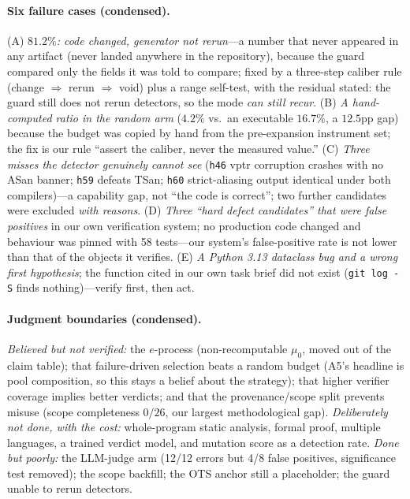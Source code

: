 \paragraph{Six failure cases (condensed).}
(A) \emph{$81.2\%$: code changed, generator not rerun}---a number that never appeared in any
artifact (never landed anywhere in the repository), because the guard compared only the fields it
was told to compare; fixed by a three-step caliber rule (change $\Rightarrow$ rerun
$\Rightarrow$ void) plus a range self-test, with the residual stated: the guard still does not rerun
detectors, so the mode \emph{can still recur}.
(B) \emph{A hand-computed ratio in the random arm} ($4.2\%$ vs.\ an executable $16.7\%$, a
$12.5$pp gap) because the budget was copied by hand from the pre-expansion instrument set; the fix
is our rule ``assert the caliber, never the measured value.'' (C) \emph{Three misses the detector
genuinely cannot see} (\texttt{h46} vptr corruption crashes with no ASan banner; \texttt{h59}
defeats TSan; \texttt{h60} strict-aliasing output identical under both compilers)---a capability
gap, not ``the code is correct''; two further candidates were excluded \emph{with reasons}.
(D) \emph{Three ``hard defect candidates'' that were false positives} in our own verification
system; no production code changed and behaviour was pinned with 58 tests---our system's
false-positive rate is not lower than that of the objects it verifies. (E) \emph{A Python 3.13
dataclass bug and a wrong first hypothesis}; the function cited in our own task brief did not exist
(\texttt{git log -S} finds nothing)---verify first, then act.

\paragraph{Judgment boundaries (condensed).}
\emph{Believed but not verified:} the $e$-process (non-recomputable $\mu_0$, moved out of the claim
table); that failure-driven selection beats a random budget (A5's headline is pool composition, so
this stays a belief about the strategy); that higher verifier coverage implies better verdicts; and
that the provenance/scope split prevents misuse (scope completeness $0/26$, our largest
methodological gap). \emph{Deliberately not done, with the cost:} whole-program static analysis,
formal proof, multiple languages, a trained verdict model, and mutation score as a detection rate.
\emph{Done but poorly:} the LLM-judge arm (12/12 errors but 4/8 false positives, significance test
removed); the scope backfill; the OTS anchor still a placeholder; the guard unable to rerun
detectors.


